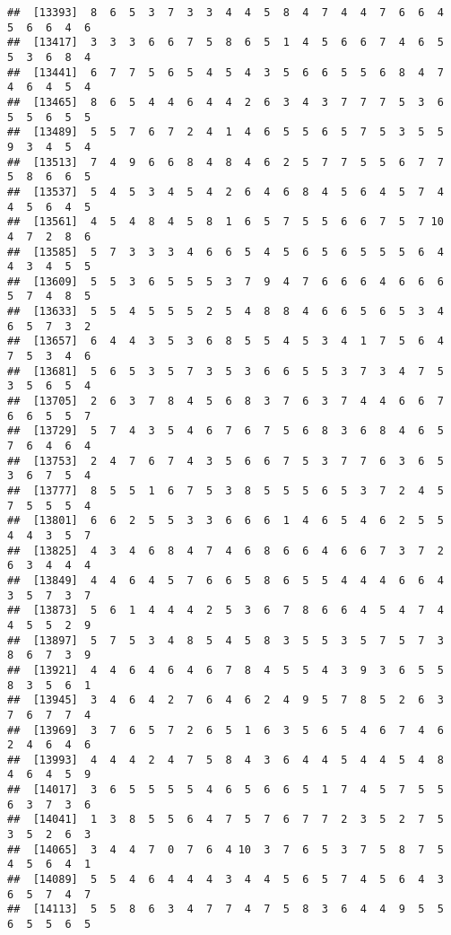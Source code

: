 \documentclass[
]{book}
\begin{document}
\begin{verbatim}
##  [13393]  8  6  5  3  7  3  3  4  4  5  8  4  7  4  4  7  6  6  4  5  6  6  4  6
##  [13417]  3  3  3  6  6  7  5  8  6  5  1  4  5  6  6  7  4  6  5  5  3  6  8  4
##  [13441]  6  7  7  5  6  5  4  5  4  3  5  6  6  5  5  6  8  4  7  4  6  4  5  4
##  [13465]  8  6  5  4  4  6  4  4  2  6  3  4  3  7  7  7  5  3  6  5  5  6  5  5
##  [13489]  5  5  7  6  7  2  4  1  4  6  5  5  6  5  7  5  3  5  5  9  3  4  5  4
##  [13513]  7  4  9  6  6  8  4  8  4  6  2  5  7  7  5  5  6  7  7  5  8  6  6  5
##  [13537]  5  4  5  3  4  5  4  2  6  4  6  8  4  5  6  4  5  7  4  4  5  6  4  5
##  [13561]  4  5  4  8  4  5  8  1  6  5  7  5  5  6  6  7  5  7 10  4  7  2  8  6
##  [13585]  5  7  3  3  3  4  6  6  5  4  5  6  5  6  5  5  5  6  4  4  3  4  5  5
##  [13609]  5  5  3  6  5  5  5  3  7  9  4  7  6  6  6  4  6  6  6  5  7  4  8  5
##  [13633]  5  5  4  5  5  5  2  5  4  8  8  4  6  6  5  6  5  3  4  6  5  7  3  2
##  [13657]  6  4  4  3  5  3  6  8  5  5  4  5  3  4  1  7  5  6  4  7  5  3  4  6
##  [13681]  5  6  5  3  5  7  3  5  3  6  6  5  5  3  7  3  4  7  5  3  5  6  5  4
##  [13705]  2  6  3  7  8  4  5  6  8  3  7  6  3  7  4  4  6  6  7  6  6  5  5  7
##  [13729]  5  7  4  3  5  4  6  7  6  7  5  6  8  3  6  8  4  6  5  7  6  4  6  4
##  [13753]  2  4  7  6  7  4  3  5  6  6  7  5  3  7  7  6  3  6  5  3  6  7  5  4
##  [13777]  8  5  5  1  6  7  5  3  8  5  5  5  6  5  3  7  2  4  5  7  5  5  5  4
##  [13801]  6  6  2  5  5  3  3  6  6  6  1  4  6  5  4  6  2  5  5  4  4  3  5  7
##  [13825]  4  3  4  6  8  4  7  4  6  8  6  6  4  6  6  7  3  7  2  6  3  4  4  4
##  [13849]  4  4  6  4  5  7  6  6  5  8  6  5  5  4  4  4  6  6  4  3  5  7  3  7
##  [13873]  5  6  1  4  4  4  2  5  3  6  7  8  6  6  4  5  4  7  4  4  5  5  2  9
##  [13897]  5  7  5  3  4  8  5  4  5  8  3  5  5  3  5  7  5  7  3  8  6  7  3  9
##  [13921]  4  4  6  4  6  4  6  7  8  4  5  5  4  3  9  3  6  5  5  8  3  5  6  1
##  [13945]  3  4  6  4  2  7  6  4  6  2  4  9  5  7  8  5  2  6  3  7  6  7  7  4
##  [13969]  3  7  6  5  7  2  6  5  1  6  3  5  6  5  4  6  7  4  6  2  4  6  4  6
##  [13993]  4  4  4  2  4  7  5  8  4  3  6  4  4  5  4  4  5  4  8  4  6  4  5  9
##  [14017]  3  6  5  5  5  5  4  6  5  6  6  5  1  7  4  5  7  5  5  6  3  7  3  6
##  [14041]  1  3  8  5  5  6  4  7  5  7  6  7  7  2  3  5  2  7  5  3  5  2  6  3
##  [14065]  3  4  4  7  0  7  6  4 10  3  7  6  5  3  7  5  8  7  5  4  5  6  4  1
##  [14089]  5  5  4  6  4  4  4  3  4  4  5  6  5  7  4  5  6  4  3  6  5  7  4  7
##  [14113]  5  5  8  6  3  4  7  7  4  7  5  8  3  6  4  4  9  5  5  6  5  5  6  5

\end{verbatim}
\end{document}
